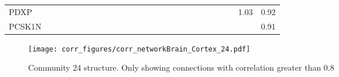 \begin{longtable}{lrrrrrrrrrrrrrrrrrrrrrrrrr}
PDXP          &               &            &                &               &            &               &             &               &               &              &             &             &                &               &                     &             &                &               &             &              &              &               &            &         1.03 &            0.92 \\
PCSK1N        &               &            &                &               &            &               &             &               &               &              &             &             &                &               &                     &             &                &               &             &              &              &               &            &              &            0.91 \\
\end{longtable}


\begin{figure}[h!]
\centering
\texttt{[image: corr\_figures/corr\_networkBrain\_Cortex\_24.pdf]}
\caption{Community 24 structure. Only showing connections with correlation greater than 0.8}
\end{figure}


